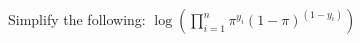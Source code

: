 \documentclass[border=3bp]{standalone}
\begin{document}
\begin{minipage}{3.5in}
Simplify the following: $\log \left(\prod_{i = 1}^{n} \pi^{y_i}(1 - \pi)^{(1 - y_i)} \right)$
\end{minipage}
\end{document}
